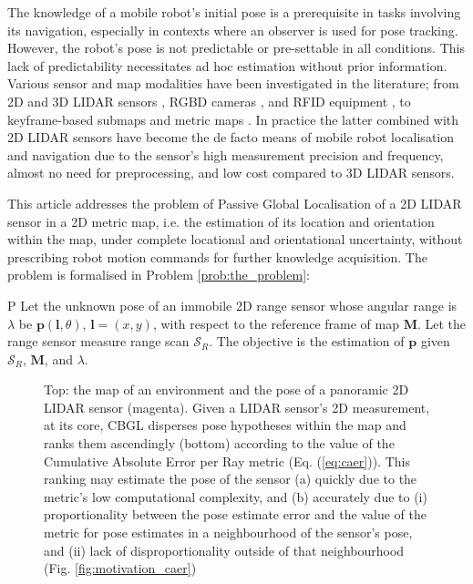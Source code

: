 The knowledge of a mobile robot's initial pose is a prerequisite in tasks
involving its navigation, especially in contexts where an observer is used for
pose tracking. However, the robot's pose is not predictable or pre-settable in
all conditions. This lack of predictability necessitates ad hoc estimation
without prior information. Various sensor and map modalities have been
investigated in the literature; from 2D and 3D LIDAR sensors
\cite{als_eth,Cop2018a}, RGBD cameras \cite{Guo2016}, and RFID equipment
\cite{Tzitzis2023b}, to keyframe-based submaps \cite{Lowry2016} and metric maps
\cite{Rosen2021}. In practice the latter combined with 2D LIDAR sensors have
become the de facto means of mobile robot localisation and navigation due to
the sensor's high measurement precision and frequency, almost no need for
preprocessing, and low cost compared to 3D LIDAR sensors.

This article addresses the problem of Passive Global Localisation of a 2D LIDAR
sensor in a 2D metric map, i.e. the estimation of its location and orientation
within the map, under complete locational and orientational uncertainty,
without prescribing robot motion commands
for further knowledge acquisition. The problem is
formalised in Problem \ref{prob:the_problem}:

\begin{customprb}{P}
  \label{prob:the_problem}
  Let the unknown pose of an immobile 2D range sensor whose angular range is
  $\lambda$ be $\bm{p}(\bm{l},\theta)$, $\bm{l} = (x,y)$, with respect to the
  reference frame of map $\bm{M}$. Let the range sensor measure range scan
  $\mathcal{S}_R$. The objective is the estimation of $\bm{p}$ given
  $\mathcal{S}_R$, $\bm{M}$, and $\lambda$.
\end{customprb}

\begin{figure}\vspace{0.4em}
  
  \vspace{-1.65cm}
  \caption{\small Top: the map of an environment and the pose of a panoramic 2D
           LIDAR sensor (magenta). Given a LIDAR sensor's 2D measurement, at its
           core, CBGL disperses pose hypotheses within the map and ranks them
           ascendingly (bottom) according to the value of the Cumulative
           Absolute Error per Ray metric (Eq. (\ref{eq:caer})). This
           ranking may estimate the pose of the sensor (a) quickly due to the
           metric's low computational complexity, and (b) accurately due to (i)
           proportionality between the pose estimate error and the value of the
           metric for pose estimates in a neighbourhood of the sensor's pose,
           and (ii) lack of disproportionality outside of that neighbourhood
           (Fig. \ref{fig:motivation_caer})
           }
  \label{fig:face}
\end{figure}

